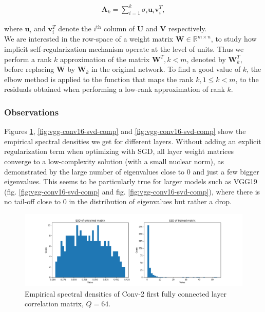 \begin{align*}
\mathbf{A}_k = \sum\limits_{i=1}^k \sigma_i \mathbf{u}_i \mathbf{v}_i^T,
\end{align*}

where $\mathbf{u}_i$ and $\mathbf{v}_i^T$ denote the $i^{\text{th}}$ column of $\mathbf{U}$ and $\mathbf{V}$ respectively. \\

We are interested in the row-space of a weight matrix $\mathbf{W} \in \mathbb{R}^{m \times n}$, to study how implicit self-regularization mechanism operate at the level of units. Thus we perform a rank $k$ approximation of the matrix $\mathbf{W}^T, k < m$, denoted by $\mathbf{W}_k^T$, before replacing $\mathbf{W}$ by $\mathbf{W}_k$ in the original network. To find a good value of $k$, the elbow method is applied to the function that maps the rank $k, 1 \leq k < m$, to the residuals obtained when performing a low-rank approximation of rank $k$.

\subsubsection*{Observations}

Figures \ref{fig:conv2-fc1-svd-comp}, \ref{fig:vgg-conv16-svd-comp} and \ref{fig:vgg-conv16-svd-comp} show the empirical spectral densities we get for different layers. Without adding an explicit regularization term when optimizing with SGD, all layer weight matrices converge to a low-complexity solution (with a small nuclear norm), as demonstrated by the large number of eigenvalues close to 0 and just a few bigger eigenvalues. This seems to be particularly true for larger models such as VGG19 (fig. \ref{fig:vgg-conv16-svd-comp} and fig. \ref{fig:vgg-conv16-svd-comp}), where there is no tail-off close to 0 in the distribution of eigenvalues but rather a drop. \\

\begin{figure}[H]
\centering
	\includegraphics[scale=0.36]{images/conv2-fc1-svd-comp.png}
\caption{Empirical spectral densities of Conv-2 first fully connected layer correlation matrix, $Q = 64$.}
\label{fig:conv2-fc1-svd-comp} 
\end{figure}

